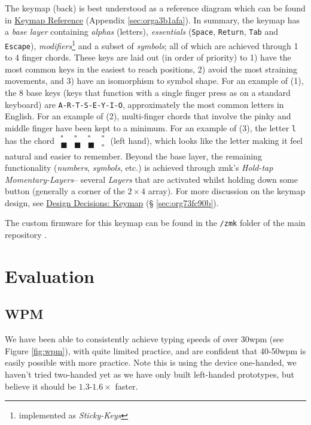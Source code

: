 \documentclass[logo,bsc,singlespacing,parskip]{infthesis}
\begin{document}
The keymap (back) is best understood as a reference diagram which can be found in
\hyperref[sec:orga3b1afa]{Keymap Reference} (Appendix \ref{sec:orga3b1afa}).
In summary, the keymap has a \emph{base layer} containing \emph{alphas} (letters), \emph{essentials} (\texttt{Space}, \texttt{Return}, \texttt{Tab} and \texttt{Escape}), \emph{modifiers}\footnote{implemented as \emph{Sticky-Keys}} and a subset of \emph{symbols}; all of which are achieved through 1 to 4 finger chords.
These keys are laid out (in order of priority) to 1) have the most common keys in the easiest to reach positions, 2) avoid the most straining movements, and 3) have an isomorphism to symbol shape.
For an example of (1), the 8 base keys (keys that function with a single finger press as on a standard keyboard) are  \texttt{A-R-T-S-E-Y-I-O}, approximately the most common letters in English.
For an example of (2), multi-finger chords that involve the pinky and middle finger have been kept to a minimum.
For an example of (3), the letter \texttt{l} has the chord \(\begin{matrix} \square & \square  & \square  & \square \\ \blacksquare &  \blacksquare & \blacksquare & \square \end{matrix}\) (left hand), which looks like the letter making it feel natural and easier to remember.
Beyond the base layer, the remaining functionality (\emph{numbers}, \emph{symbols}, etc.) is achieved through zmk's \autocite{ZMKFirmware}  \emph{Hold-tap} \emph{Momentary-Layers}-- several \emph{Layers} that are activated whilst holding down some button (generally a corner of the \(2\times4\) array).
For more discussion on the keymap design, see \hyperref[sec:org73fc90b]{Design Decisions: Keymap} (§ \ref{sec:org73fc90b}).

The custom firmware for this keymap can be found in the \texttt{/zmk} folder of the main repository \autocite{sharpNazzacodeHCIDMy}.
\section{Evaluation}
\label{sec:org40ecba4}
\subsection{WPM}
\label{sec:orgc1ddddb}
We have been able to consistently achieve typing speeds of over 30wpm (see Figure \ref{fig:wpm}), with quite limited practice, and are confident that 40-50wpm is easily possible with more practice.
Note this is using the device one-handed, we haven't tried two-handed yet as we have only built left-handed prototypes, but believe it should be \(1.3\)-\(1.6\times\) faster.
\end{document}
